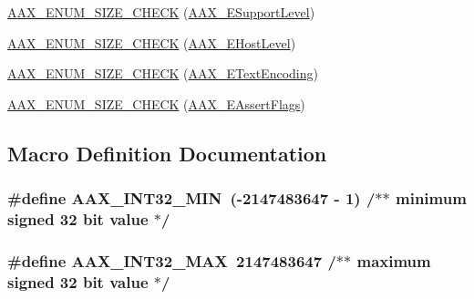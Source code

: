 \begin{DoxyCompactItemize}
\hyperlink{a00206_ae131459a5bc5dfae6de6551e96a5eb8d}{A\+A\+X\+\_\+\+E\+N\+U\+M\+\_\+\+S\+I\+Z\+E\+\_\+\+C\+H\+E\+C\+K} (\hyperlink{a00206_aca7bf42860665d5da66f4ac342e761b3}{A\+A\+X\+\_\+\+E\+Support\+Level})
\item 
\hyperlink{a00206_aea64259ed31d6b2271ded6f4c1325f26}{A\+A\+X\+\_\+\+E\+N\+U\+M\+\_\+\+S\+I\+Z\+E\+\_\+\+C\+H\+E\+C\+K} (\hyperlink{a00206_a2d34e7a7c2e6f4f6361555ad02869219}{A\+A\+X\+\_\+\+E\+Host\+Level})
\item 
\hyperlink{a00206_a9ca46becb59b9509df91bb70afbab1b7}{A\+A\+X\+\_\+\+E\+N\+U\+M\+\_\+\+S\+I\+Z\+E\+\_\+\+C\+H\+E\+C\+K} (\hyperlink{a00206_a8152e57310850693e4e7f00fc4922d74}{A\+A\+X\+\_\+\+E\+Text\+Encoding})
\item 
\hyperlink{a00206_af8572aa728e4a62d27090ccb82a14e43}{A\+A\+X\+\_\+\+E\+N\+U\+M\+\_\+\+S\+I\+Z\+E\+\_\+\+C\+H\+E\+C\+K} (\hyperlink{a00206_ab87a565fcd58c3d860d50a210b264985}{A\+A\+X\+\_\+\+E\+Assert\+Flags})
\end{DoxyCompactItemize}


\subsection{Macro Definition Documentation}
\hypertarget{a00206_ae7543e71654aff007dd5e118f550ade4}{}
\subsubsection[{A\+A\+X\+\_\+\+I\+N\+T32\+\_\+\+M\+I\+N}]{\setlength{\rightskip}{0pt plus 5cm}\#define A\+A\+X\+\_\+\+I\+N\+T32\+\_\+\+M\+I\+N~(-\/2147483647 -\/ 1) /$\ast$$\ast$ minimum signed 32 bit value $\ast$/}\label{a00206_ae7543e71654aff007dd5e118f550ade4}
\hypertarget{a00206_a3f56ffc36648f848d952971b79e6058e}{}
\subsubsection[{A\+A\+X\+\_\+\+I\+N\+T32\+\_\+\+M\+A\+X}]{\setlength{\rightskip}{0pt plus 5cm}\#define A\+A\+X\+\_\+\+I\+N\+T32\+\_\+\+M\+A\+X~2147483647      /$\ast$$\ast$ maximum signed 32 bit value $\ast$/}\label{a00206_a3f56ffc36648f848d952971b79e6058e}
\hypertarget{a00206_ac15bf852c0f424d26e5d192cd071cea5}{}
